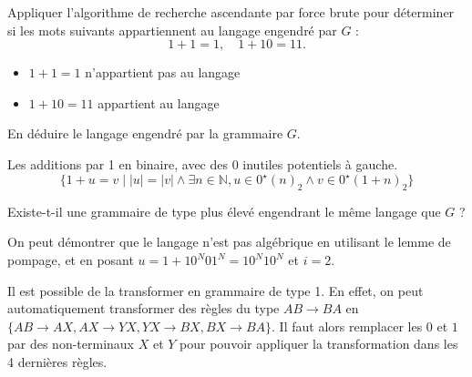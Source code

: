 \begin{exercice}
  \begin{questions}
  \item Appliquer l'algorithme de recherche ascendante par force brute pour déterminer
    si les mots suivants appartiennent au langage engendré par $G$ :
    $$1+1=1, \quad 1+10=11.$$
  \end{questions}
  \begin{corrections}
    \begin{itemize}
    \item $1+1=1$ n'appartient pas au langage
    \item $1+10=11$ appartient au langage
    \end{itemize}
  \end{corrections}

  \begin{questions}
  \item En déduire le langage engendré par la grammaire $G$.
  \end{questions}
  \begin{corrections}
    Les additions par 1 en binaire, avec des 0 inutiles potentiels à gauche. 
    $$\{ 1 + u = v \mid |u| = |v| \land \exists n\in \mathbb{N}, u \in 0^\star(n)_2 \land v \in 0^\star (1+n)_2 \}$$
  \end{corrections}
  
  \ifcorrection{\pagebreak}
  \begin{questions}
  \item Existe-t-il une grammaire de type plus élevé engendrant le même langage que $G$ ? 
  \end{questions}
  \begin{corrections}
    On peut démontrer que le langage n'est pas algébrique en utilisant le lemme de pompage, et en posant $u = 1+10^N01^N = 10^N10^N$ et $i=2$.

    Il est possible de la transformer en grammaire de type 1. En effet,
    on peut automatiquement transformer des règles du type $AB\rightarrow BA$ en $\{AB \rightarrow AX, AX\rightarrow YX, YX\rightarrow BX, BX\rightarrow BA\}$.
    Il faut alors remplacer les $0$ et $1$ par des non-terminaux $X$ et $Y$ pour pouvoir appliquer la transformation dans les 4 dernières règles.
    

\end{corrections}
\end{exercice}
